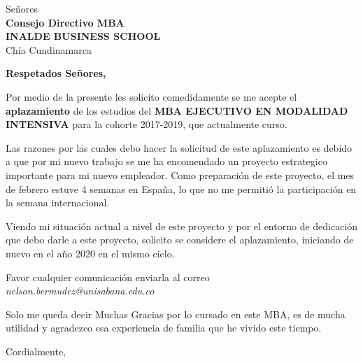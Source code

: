 \documentclass[12pt]{letter} %
\date{Marzo 28, 2019}
\begin{document}

\begin{letter}{Señores \\ \textbf{Consejo Directivo MBA}  \\ \textbf{INALDE BUSINESS SCHOOL} \\ Chía Cundinamarca} %


\opening{\textbf{Respetados Señores,}}

Por medio de la presente les solicito comedidamente se me acepte el \textbf{aplazamiento} de los
estudios del \textbf{MBA EJECUTIVO EN MODALIDAD INTENSIVA} para la cohorte 2017-2019, que actualmente curso.

Las razones por las cuales debo hacer la solicitud de este aplazamiento es debido a que por mi nuevo
trabajo se me ha encomendado un proyecto estrategico importante para mi nuevo empleador. Como preparación
de este proyecto, el mes de febrero estuve 4 semanas en España, lo que no me permitió la participación 
en la semana internacional. 

Viendo mi situación actual a nivel de este proyecto y por el entorno de dedicación que debo darle a 
este proyecto, solicito se considere el aplazamiento, iniciando de nuevo en el año 2020 en el mismo ciclo.

Favor cualquier comunicación enviarla al correo 
\emph{nelson.bermudez@unisabana.edu.co}

Solo me queda decir Muchas Gracias por lo cursado en este MBA, es de mucha utilidad y agradezco esa experiencia
de familia que he vivido este tiempo.


\vspace{2\parskip} %
\closing{Cordialmente,}
\vspace{2\parskip} %




\end{letter}
 
\end{document}
